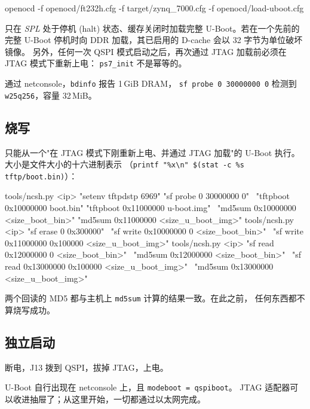 \documentclass[11pt,a4paper,oneside]{article}
\newcommand{\cmd}[1]{\texttt{#1}}
\begin{document}
\begin{shell}
openocd -f openocd/ft232h.cfg -f target/zynq_7000.cfg -f openocd/load-uboot.cfg
\end{shell}

\begin{mustknow}
只在 \emph{SPL} 处于停机 (halt) 状态、缓存关闭时加载完整 U-Boot。若在一个先前的
完整 U-Boot 停机时向 DDR 加载，其已启用的 D-cache 会以 32 字节为单位破坏镜像。
另外，任何一次 QSPI 模式启动之后，再次通过 JTAG 加载前必须在 JTAG 模式下重新上电：
\cmd{ps7\_init} 不是幂等的。
\end{mustknow}

\begin{checkpoint}
通过 netconsole，\cmd{bdinfo} 报告 1\,GiB DRAM，
\cmd{sf probe 0 30000000 0} 检测到 \cmd{w25q256}，容量 32\,MiB。
\end{checkpoint}

\subsection{烧写}

只能从一个"在 JTAG 模式下刚重新上电、并通过 JTAG 加载"的 U-Boot 执行。
大小是文件大小的十六进制表示
（\cmd{printf "\%x\textbackslash n" \$(stat -c \%s tftp/boot.bin)}）：

\begin{shell}
tools/ncsh.py <ip> "setenv tftpdstp 6969" "sf probe 0 30000000 0" \
  "tftpboot 0x10000000 boot.bin" "tftpboot 0x11000000 u-boot.img" \
  "md5sum 0x10000000 <size_boot_bin>" "md5sum 0x11000000 <size_u_boot_img>"
tools/ncsh.py <ip> "sf erase 0 0x300000" \
  "sf write 0x10000000 0 <size_boot_bin>" \
  "sf write 0x11000000 0x100000 <size_u_boot_img>"
tools/ncsh.py <ip> "sf read 0x12000000 0 <size_boot_bin>" \
  "md5sum 0x12000000 <size_boot_bin>" \
  "sf read 0x13000000 0x100000 <size_u_boot_img>" \
  "md5sum 0x13000000 <size_u_boot_img>"
\end{shell}

\begin{checkpoint}
两个回读的 MD5 都与主机上 \cmd{md5sum} 计算的结果一致。在此之前，
任何东西都不算烧写成功。
\end{checkpoint}

\subsection{独立启动}

断电，J13 拨到 QSPI，拔掉 JTAG，上电。

\begin{checkpoint}
U-Boot 自行出现在 netconsole 上，且 \cmd{modeboot = qspiboot}。
JTAG 适配器可以收进抽屉了；从这里开始，一切都通过以太网完成。
\end{checkpoint}
\end{document}
